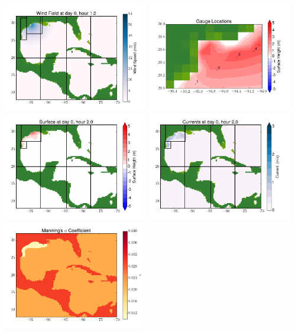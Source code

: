 \documentclass[11pt]{article}
\begin{document}
\vskip 10pt 
\includegraphics[width=0.475\textwidth]{frame0073fig9.png}
\includegraphics[width=0.475\textwidth]{frame0073fig10.png}
\vskip 10pt 
\includegraphics[width=0.475\textwidth]{frame0074fig1.png}
\includegraphics[width=0.475\textwidth]{frame0074fig2.png}
\vskip 10pt 
\includegraphics[width=0.475\textwidth]{frame0074fig3.png}
\end{document}
